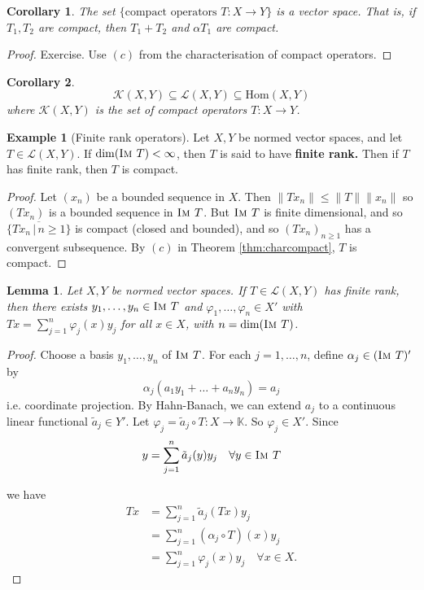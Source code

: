 \documentclass[10pt, reqno, oneside]{amsart}
\theoremstyle{plain}%
\newtheorem{lem}[thm]{Lemma}
\newtheorem*{cor}{Corollary}
\theoremstyle{definition}
\newtheorem{exmp}[thm]{Example}
\theoremstyle{remark}
\newcommand{\given}{ \, | \,}
\newcommand{\K}{\mathbb{K}}
\renewcommand{\phi}{\varphi}
\newcommand{\im}{\textsc{Im\ }}
\begin{document}
\begin{cor}
	The set $\{ \text{compact operators $T : X \rightarrow Y$}\}$ is a vector space.  That is, if $T_1, T_2$ are compact, then $T_1 + T_2$ and $\alpha T_1$ are compact.  
\end{cor}

\begin{proof}
	Exercise.  Use $(c)$ from the characterisation of compact operators.
\end{proof}

\begin{cor}
	\[
		\mathcal K(X,Y) \subseteq \mathcal L(X, Y) \subseteq \text{Hom}(X,Y)
	\] where $\mathcal K(X,Y)$ is the set of compact operators $T : X \rightarrow Y$. 
\end{cor}

\begin{exmp}[Finite rank operators]  
	Let $X, Y$ be normed vector spaces, and let $T \in \mathcal L(X,Y)$.  If $\dim(\im T) < \infty$, then $T$ is said to have \textbf{finite rank.}  Then if $T$ has finite rank, then $T$ is compact.
\end{exmp}

\begin{proof}
	Let $(x_n)$ be a bounded sequence in $X$.  Then $\| Tx_n \| \leq \| T \| \| x_n \|$ so $(Tx_n)$ is a bounded sequence in $\im T$.  But $\im T$ is finite dimensional, and so $\overline{ \{ Tx_n \given n \geq 1 \}}$ is compact (closed and bounded), and so $(Tx_n)_{n \geq 1}$ has a convergent subsequence.  By $(c)$ in Theorem \ref{thm:charcompact}, $T$ is compact. 
\end{proof}

\begin{lem}
	Let $X, Y$ be normed vector spaces.  If $T \in \mathcal L(X,Y)$ has finite rank, then there exists $y_1, \dots, y_n \in \im T$ and $\phi_1, \dots, \phi_n \in X'$ with $Tx = \sum_{j=1}^n \phi_j(x) y_j$ for all $x \in X$, with $n = \dim( \im T)$. 
\end{lem}

\begin{proof}
	Choose a basis $y_1, \dots, y_n$ of $\im T$.  For each $j = 1, \dots, n$, define $\alpha_j \in (\im T)'$ by \[
		\alpha_j(a_1 y_1 + \dots + a_n y_n) = a_j
	\] i.e. coordinate projection.  By Hahn-Banach, we can extend $a_j$ to a continuous linear functional $\tilde a_j \in Y'$.  Let $\phi_j = \tilde a_j \circ T : X \rightarrow \K$.  So $\phi_j \in X'$.  Since \[
		 y = \sum_{j=1}^n \tilde a_j(y) y_j \quad \forall y \in \im T
	\] 
	
	we have \begin{align*}
		Tx 	&= \sum_{j= 1}^n \tilde a_j (Tx) y_j \\
			&= \sum_{j=1}^n (\alpha_j \circ T)(x) y_j	 \\
			&= \sum_{j=1}^n \phi_j(x) y_j \quad \forall x \in X.
	\end{align*}
\end{proof}
\end{document}
